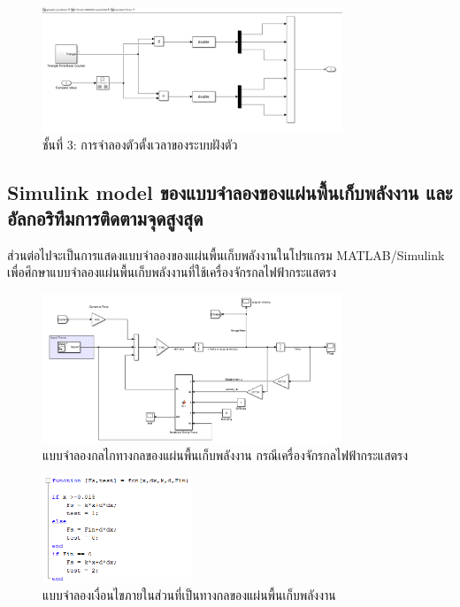 \documentclass[11pt,a4paper]{article}
\begin{document}
\begin{figure}[H]
    \centering
    \includegraphics[width=0.8\textwidth]{l3-sim-tim.png}
    \caption{ชั้นที่ 3: การจำลองตัวตั้งเวลาของระบบฝังตัว}
\end{figure}

\subsection{Simulink model ของแบบจำลองของแผ่นพื้นเก็บพลังงาน และอัลกอริทึมการติดตามจุดสูงสุด}
ส่วนต่อไปจะเป็นการแสดงแบบจำลองของแผ่นพื้นเก็บพลังงานในโปรแกรม MATLAB/Simulink เพื่อศึกษาแบบจำลองแผ่นพื้นเก็บพลังงานที่ใช้เครื่องจักรกลไฟฟ้ากระแสตรง
\begin{figure}[H]
    \centering
    \includegraphics[width=0.8\textwidth]{mech_model_dc.png}
    \caption{แบบจำลองกลไกทางกลของแผ่นพื้นเก็บพลังงาน กรณีเครื่องจักรกลไฟฟ้ากระแสตรง}
\end{figure}
\begin{figure}[H]
    \centering
    \includegraphics[width=0.4\textwidth]{condition_mech.png}
    \caption{แบบจำลองเงื่อนไขภายในส่วนที่เป็นทางกลของแผ่นพื้นเก็บพลังงาน}
\end{figure}
\end{document}
